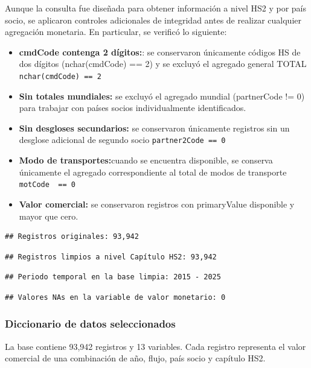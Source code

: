 \documentclass[
]{article}
\providecommand{\tightlist}{%
  \setlength{\itemsep}{0pt}\setlength{\parskip}{0pt}}
\begin{document}
Aunque la consulta fue diseñada para obtener información a nivel HS2 y
por país socio, se aplicaron controles adicionales de integridad antes
de realizar cualquier agregación monetaria. En particular, se verificó
lo siguiente:

\begin{itemize}
\tightlist
\item
  \textbf{cmdCode contenga 2 dígitos:}: se conservaron únicamente
  códigos HS de dos dígitos (nchar(cmdCode) == 2) y se excluyó el
  agregado general TOTAL \texttt{nchar(cmdCode)\ ==\ 2}\\
\item
  \textbf{Sin totales mundiales:} se excluyó el agregado mundial
  (partnerCode != 0) para trabajar con países socios individualmente
  identificados.
\item
  \textbf{Sin desgloses secundarios:} se conservaron únicamente
  registros sin un desglose adicional de segundo socio
  \texttt{partner2Code\ ==\ 0}
\item
  \textbf{Modo de transportes:}cuando se encuentra disponible, se
  conserva únicamente el agregado correspondiente al total de modos de
  transporte \texttt{motCode\ \ ==\ 0}
\item
  \textbf{Valor comercial:} se conservaron registros con primaryValue
  disponible y mayor que cero.
\end{itemize}

\begin{verbatim}
## Registros originales: 93,942
\end{verbatim}

\begin{verbatim}
## Registros limpios a nivel Capítulo HS2: 93,942
\end{verbatim}

\begin{verbatim}
## Periodo temporal en la base limpia: 2015 - 2025
\end{verbatim}

\begin{verbatim}
## Valores NAs en la variable de valor monetario: 0
\end{verbatim}

\subsubsection{Diccionario de datos
seleccionados}\label{diccionario-de-datos-seleccionados}

La base contiene 93,942 registros y 13 variables. Cada registro
representa el valor comercial de una combinación de año, flujo, país
socio y capítulo HS2.
\end{document}
